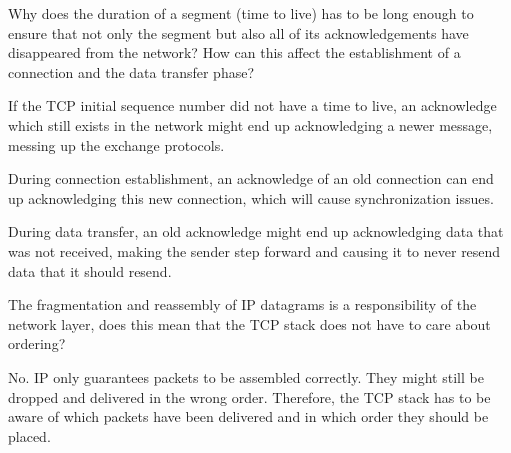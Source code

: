 \begin{Exercise}
Why does the duration of a segment (time to live) has to be long enough to ensure that not only the segment but also all of its acknowledgements have disappeared from the network?
How can this affect the establishment of a connection and the data transfer phase?
\end{Exercise}
\begin{Answer}
If the TCP initial sequence number did not have a time to live, an acknowledge which still exists in the network might end up acknowledging a newer message, messing up the exchange protocols.

During connection establishment, an acknowledge of an old connection can end up acknowledging this new connection, which will cause synchronization issues.

During data transfer, an old acknowledge might end up acknowledging data that was not received, making the sender step forward and causing it to never resend data that it should resend.
\end{Answer}

\begin{Exercise}
The fragmentation and reassembly of IP datagrams is a responsibility of the network layer, does this mean that the TCP stack does not have to care about ordering?
\end{Exercise}
\begin{Answer}
No. IP only guarantees packets to be assembled correctly. They might still be dropped and delivered in the wrong order.
Therefore, the TCP stack has to be aware of which packets have been delivered and in which order they should be placed.
\end{Answer}

